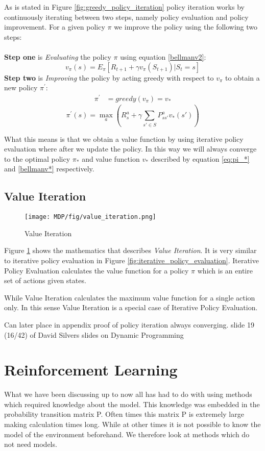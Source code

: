 As is stated in Figure \ref{fig:greedy_policy_iteration} policy iteration works by continuously iterating between two steps, namely policy evaluation and policy improvement.
For a given policy $\pi$ we improve the policy using the following two steps:\\\\
\textbf{Step one} is \textit{Evaluating} the policy $\pi$ using equation \ref{bellmanv2}: \[v_{\pi}(s) = E_{\pi}[R_{t+1} + \gamma v_{\pi}(S_{t+1})|S_t = s]\]
\textbf{Step two} is \textit{Improving} the policy by acting greedy with respect to $v_\pi$ to obtain a new policy $\pi^{'}$:
\begin{align}
	\pi^{'} &= greedy(v_{\pi})= v_{*}
	\label{pi'}
\end{align}
\[\pi^{'}(s) = \max\limits_{a}(R^{a}_s+\gamma\sum_{s'\in S}P^{a}_{ss'}v_*(s'))\]

What this means is that we obtain a value function by using iterative policy evaluation where after we update the policy. In this way we will always converge to the optimal policy $\pi_{*}$ and value function $v_{*}$ described by equation \ref{eq:pi_*} and \ref{bellmanv*} respectively.
\subsection{Value Iteration}
\begin{figure}[!htb]
	\centering
	\texttt{[image: MDP/fig/value\_iteration.png]}
	\caption{Value Iteration\cite{David_Silver}}
	\label{fig:value_iteration}
\end{figure}
Figure \ref{fig:value_iteration} shows the mathematics that describes \textit{Value Iteration}. It is very similar to iterative policy evaluation in Figure \ref{fig:iterative_policy_evaluation}. Iterative Policy Evaluation calculates the value function for a policy $\pi$ which is an entire set of actions given states.

While Value Iteration calculates the maximum value function for a single action only. In this sense Value Iteration is a special case of Iterative Policy Evaluation.

{\color{red} Can later place in appendix proof of policy iteration always converging. slide 19 (16/42) of David Silvers slides on Dynamic Programming}
\section{Reinforcement Learning}
What we have been discussing up to now all has had to do with using methods which required knowledge about the model. This knowledge was embedded in the probability transition matrix P. Often times this matrix P is extremely large making calculation times long. While at other times it is not possible to know the model of the environment beforehand. We therefore look at methods which do not need models.

